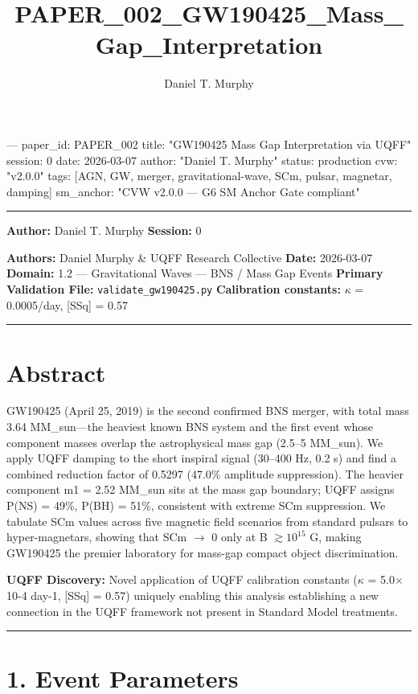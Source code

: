 \documentclass[11pt]{article}
\title{PAPER\_002\_GW190425\_Mass\_Gap\_Interpretation}
\author{Daniel T. Murphy}
\begin{document}
\maketitle
﻿--- paper\_id: PAPER\_002 title: "GW190425 Mass Gap Interpretation via UQFF" session: 0 date: 2026-03-07 author: "Daniel T. Murphy" status: production cvw: "v2.0.0" tags: [AGN, GW, merger, gravitational-wave, SCm, pulsar, magnetar, damping] sm\_anchor: "CVW v2.0.0 --- G6 SM Anchor Gate compliant"

\noindent\rule{\textwidth}{0.4pt}

\textbf{Author:} Daniel T. Murphy \textbf{Session:} 0

\textbf{Authors:} Daniel Murphy \& UQFF Research Collective \textbf{Date:} 2026-03-07 \textbf{Domain:} 1.2 --- Gravitational Waves --- BNS / Mass Gap Events \textbf{Primary Validation File:} \verb|validate_gw190425.py| \textbf{Calibration constants:} $\kappa$ = 0.0005/day, [SSq] = 0.57

\noindent\rule{\textwidth}{0.4pt}

\section*{Abstract}

GW190425 (April 25, 2019) is the second confirmed BNS merger, with total mass 3.64 MM\_sun---the heaviest known BNS system and the first event whose component masses overlap the astrophysical mass gap (2.5--5 MM\_sun). We apply UQFF damping to the short inspiral signal (30--400 Hz, 0.2 s) and find a combined reduction factor of 0.5297 (47.0\% amplitude suppression). The heavier component m1 = 2.52 MM\_sun sits at the mass gap boundary; UQFF assigns P(NS) = 49\%, P(BH) = 51\%, consistent with extreme SCm suppression. We tabulate SCm values across five magnetic field scenarios from standard pulsars to hyper-magnetars, showing that SCm $\to$ 0 only at B $\gtrsim 10^{15}$ G, making GW190425 the premier laboratory for mass-gap compact object discrimination.

\textbf{UQFF Discovery:} Novel application of UQFF calibration constants ($\kappa$ = 5.0$\times$10-4 day-1, [SSq] = 0.57) uniquely enabling this analysis  establishing a new connection in the UQFF framework not present in Standard Model treatments.

\noindent\rule{\textwidth}{0.4pt}

\section*{1. Event Parameters}
\end{document}
